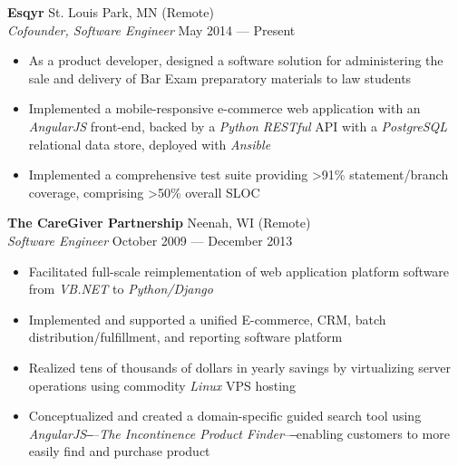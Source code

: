 \documentclass[line,margin]{res}
\begin{document}
\begin{resume}
    \textbf{Esqyr} \hfill St. Louis Park, MN {\small (Remote)} \\
    \textit{Cofounder, Software Engineer} \hfill May 2014 --- Present
        \begin{itemize}  \itemsep -2pt
            \item As a product developer, designed a software solution for
                administering the sale and delivery of Bar Exam preparatory
                materials to law students
            \item Implemented a mobile-responsive e-commerce web application
                with an \textit{AngularJS} front-end, backed by a
                \textit{Python} \textit{RESTful} API with a \textit{PostgreSQL}
                relational data store, deployed with \textit{Ansible}
            \item Implemented a comprehensive test suite providing
                \textgreater91\% statement/branch coverage, comprising
                \textgreater50\% overall SLOC
        \end{itemize}

    \textbf{The CareGiver Partnership} \hfill Neenah, WI {\small (Remote)} \\
    \textit{Software Engineer} \hfill October 2009 --- December 2013
        \begin{itemize}  \itemsep -2pt
            \item Facilitated full-scale reimplementation of web application
                platform software from \textit{VB.NET} to
                \textit{Python/Django}
            \item Implemented and supported a unified E-commerce, CRM, batch
                distribution\slash fulfillment, and reporting software platform
            \item Realized tens of thousands of dollars in yearly savings by
                virtualizing server operations using commodity \textit{Linux}
                VPS hosting
            \item Conceptualized and created a domain-specific guided search
                tool using \textit{AngularJS}‒--\textit{The Incontinence
                Product Finder}--‒enabling customers to more easily find and
                purchase product
        \end{itemize}


\end{resume}
\end{document}
